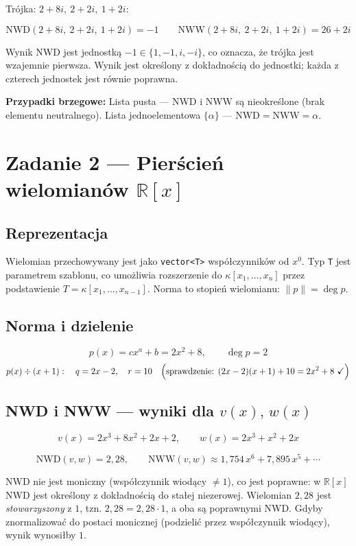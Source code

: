 \documentclass[a4paper,11pt]{article}
\begin{document}
Trójka: $2+8i,\ 2+2i,\ 1+2i$:

\[
  \text{NWD}(2+8i,\ 2+2i,\ 1+2i) = -1 \qquad \text{NWW}(2+8i,\ 2+2i,\ 1+2i) = 26+2i
\]

Wynik NWD jest jednostką $-1 \in \{1,-1,i,-i\}$, co oznacza, że trójka jest wzajemnie pierwsza.
Wynik jest określony z dokładnością do jednostki; każda z czterech jednostek jest równie poprawna.

\textbf{Przypadki brzegowe:}
Lista pusta --- NWD i NWW są nieokreślone (brak elementu neutralnego).
Lista jednoelementowa $\{\alpha\}$ --- $\text{NWD} = \text{NWW} = \alpha$.

\section*{Zadanie 2 --- Pierścień wielomianów $\mathbb{R}[x]$}

\subsection*{Reprezentacja}
Wielomian przechowywany jest jako \texttt{vector<T>} współczynników od $x^0$.
Typ \texttt{T} jest parametrem szablonu, co umożliwia rozszerzenie do $\kappa[x_1,\ldots,x_n]$ przez podstawienie $T = \kappa[x_1,\ldots,x_{n-1}]$.
Norma to stopień wielomianu: $\|p\| = \deg p$.

\subsection*{Norma i dzielenie}

\[
  p(x) = cx^a + b = 2x^2 + 8, \qquad \deg p = 2
\]
\[
  p(x) \div (x+1): \quad q = 2x - 2, \quad r = 10
  \quad \Bigl(\text{sprawdzenie: } (2x-2)(x+1)+10 = 2x^2+8\ \checkmark\Bigr)
\]

\subsection*{NWD i NWW --- wyniki dla $v(x),\, w(x)$}

\[
  v(x) = 2x^3 + 8x^2 + 2x + 2, \qquad w(x) = 2x^3 + x^2 + 2x
\]

\[
  \text{NWD}(v,w) = 2{,}28, \qquad \text{NWW}(v,w) \approx 1{,}754\,x^6 + 7{,}895\,x^5 + \cdots
\]

NWD nie jest moniczny (współczynnik wiodący $\neq 1$), co jest poprawne: w $\mathbb{R}[x]$ NWD jest określony z dokładnością do stałej niezerowej. Wielomian $2{,}28$ jest \emph{stowarzyszony} z $1$, tzn. $2{,}28 = 2{,}28 \cdot 1$, a oba są poprawnymi NWD.
Gdyby znormalizować do postaci monicznej (podzielić przez współczynnik wiodący), wynik wynosiłby $1$.
\end{document}
